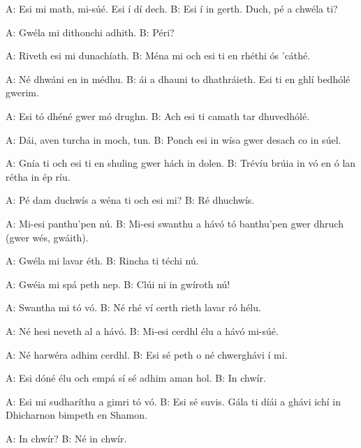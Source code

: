 A: Esi mi math, mi-s\'{u}\'{e}. Esi \'{i} d\'{i} dech.
B: Esi \'{i} in gerth. Duch, p\'{e} a chw\'{e}la ti?

A: Gw\'{e}la mi dithonchi adhith.
B: P\'{e}ri?

A: Riveth esi mi dunach\'{i}ath.
B: M\'{e}na mi och esi ti en rh\'{e}thi \'{o}s 'c\'{a}th\'{e}.

A: N\'{e} dhw\'{a}ni en in m\'{e}dhu.
B: \'{a}i a dhauni to dhathr\'{a}ieth. Esi ti en ghl\'{i} bedh\'{o}l\'{e} gwerim.

A: Esi t\'{o} dh\'{e}n\'{e} gwer m\'{o} drughn.
B: Ach esi ti camath tar dhuvedh\'{o}l\'{e}.

A: D\'{a}i, aven turcha in moch, tun.
B: Ponch esi in w\'{i}sa gwer desach co in s\'{u}el.

A: Gn\'{i}a ti och esi ti en shuling gwer h\'{a}ch in dolen.
B: Tr\'{e}v\'{i}u br\'{u}ia in v\'{o} en \'{o} lan r\'{e}tha in \'{e}p r\'{i}u.

A: P\'{e} dam duchw\'{i}s a w\'{e}na ti och esi mi?
B: R\'{e} dhuchw\'{i}s.

A: Mi-esi panthu'pen n\'{u}.
B: Mi-esi swanthu a h\'{a}v\'{o} t\'{o} banthu'pen gwer dhruch (gwer w\'{e}s, gw\'{a}ith).

A: Gw\'{e}la mi lavar \'{e}th.
B: Rincha ti t\'{e}chi n\'{u}.

A: Gw\'{e}ia mi sp\'{a} peth nep.
B: Cl\'{u}i ni in gw\'{i}roth n\'{u}!

A: Swantha mi t\'{o} v\'{o}.
B: N\'{e} rh\'{e} v\'{i} certh rieth lavar r\'{o} h\'{e}lu.

A: N\'{e} hesi neveth al a h\'{a}v\'{o}.
B: Mi-esi cerdhl \'{e}lu a h\'{a}v\'{o} mi-s\'{u}\'{e}.

A: N\'{e} harw\'{e}ra adhim cerdhl.
B: Esi s\'{e} peth o n\'{e} chwergh\'{a}vi \'{i} mi.

A: Esi d\'{o}n\'{e} \'{e}lu och emp\'{a} s\'{i} s\'{e} adhim aman hol.
B: In chw\'{i}r.

A: Esi mi sudhar\'{i}thu a gimri t\'{o} v\'{o}.
B: Esi s\'{e} suvis. G\'{a}la ti d\'{i}\'{a}i a gh\'{a}vi ich\'{i} in Dhicharnon bimpeth en Shamon.

A: In chw\'{i}r?
B: N\'{e} in chw\'{i}r.
